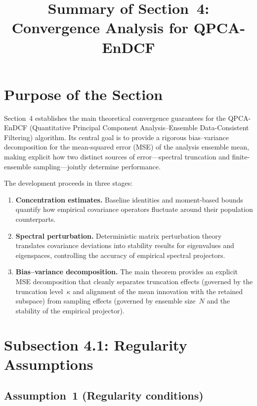 \documentclass[11pt]{article}
\title{Summary of Section~4: Convergence Analysis for QPCA-EnDCF}
\author{}
\date{}
\begin{document}
\maketitle

\section*{Purpose of the Section}

Section~4 establishes the main theoretical convergence guarantees for the
QPCA-EnDCF (Quantitative Principal Component Analysis--Ensemble Data-Consistent
Filtering) algorithm. Its central goal is to provide a rigorous bias--variance
decomposition for the mean-squared error (MSE) of the analysis ensemble mean,
making explicit how two distinct sources of error---spectral truncation and
finite-ensemble sampling---jointly determine performance.

The development proceeds in three stages:
\begin{enumerate}
  \item \textbf{Concentration estimates.} Baseline identities and moment-based
    bounds quantify how empirical covariance operators fluctuate around their
    population counterparts.
  \item \textbf{Spectral perturbation.} Deterministic matrix perturbation
    theory translates covariance deviations into stability results for
    eigenvalues and eigenspaces, controlling the accuracy of empirical spectral
    projectors.
  \item \textbf{Bias--variance decomposition.} The main theorem provides an
    explicit MSE decomposition that cleanly separates truncation effects
    (governed by the truncation level~$\kappa$ and alignment of the mean
    innovation with the retained subspace) from sampling effects (governed by
    ensemble size~$N$ and the stability of the empirical projector).
\end{enumerate}


\section*{Subsection 4.1: Regularity Assumptions}

\subsection*{Assumption~1 (Regularity conditions)}
\end{document}
